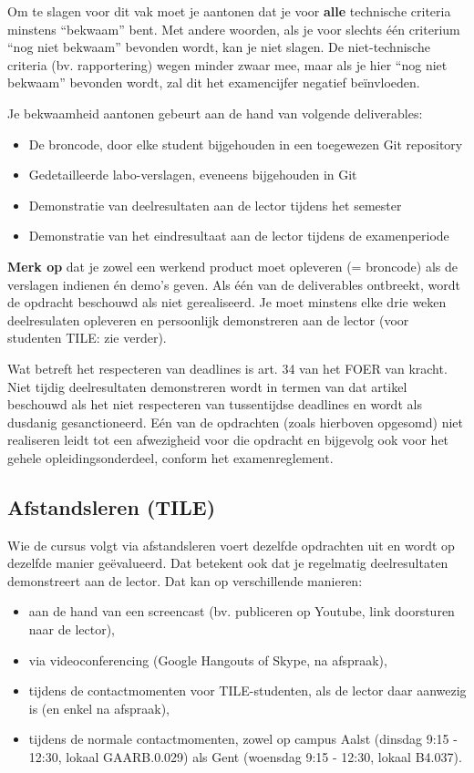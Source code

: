 Om te slagen voor dit vak moet je aantonen dat je voor \textbf{alle} technische criteria minstens ``bekwaam'' bent. Met andere woorden, als je voor slechts één criterium ``nog niet bekwaam'' bevonden wordt, kan je niet slagen. De niet-technische criteria (bv. rapportering) wegen minder zwaar mee, maar als je hier ``nog niet bekwaam'' bevonden wordt, zal dit het examencijfer negatief beïnvloeden.

Je bekwaamheid aantonen gebeurt aan de hand van volgende deliverables:

\begin{itemize}
\item De broncode, door elke student bijgehouden in een toegewezen Git repository
\item Gedetailleerde labo-verslagen, eveneens bijgehouden in Git
\item Demonstratie van deelresultaten aan de lector tijdens het semester
\item Demonstratie van het eindresultaat aan de lector tijdens de examenperiode
\end{itemize}

\textbf{Merk op} dat je zowel een werkend product moet opleveren (= broncode) als de verslagen indienen én demo's geven. Als één van de deliverables ontbreekt, wordt de opdracht beschouwd als niet gerealiseerd. Je moet minstens elke drie weken deelresulaten opleveren en persoonlijk demonstreren aan de lector (voor studenten TILE: zie verder).

Wat betreft het respecteren van deadlines is art. 34 van het FOER van kracht. Niet tijdig deelresultaten demonstreren wordt in termen van dat artikel beschouwd als het niet respecteren van tussentijdse deadlines en wordt als dusdanig gesanctioneerd. Eén van de opdrachten (zoals hierboven opgesomd) niet realiseren leidt tot een afwezigheid voor die opdracht en bijgevolg ook voor het gehele opleidingsonderdeel, conform het examenreglement.

\subsection{Afstandsleren (TILE)}
\label{afstandsleren-tile}

Wie de cursus volgt via afstandsleren voert dezelfde opdrachten uit en
wordt op dezelfde manier geëvalueerd. Dat betekent ook dat je regelmatig
deelresultaten demonstreert aan de lector. Dat kan op verschillende
manieren:

\begin{itemize}
\item aan de hand van een screencast (bv. publiceren op Youtube, link doorsturen naar de lector),
\item via videoconferencing (Google Hangouts of Skype, na afspraak),
\item tijdens de contactmomenten voor TILE-studenten, als de lector daar aanwezig is (en enkel na afspraak),
\item tijdens de normale contactmomenten, zowel op campus Aalst (dinsdag 9:15 - 12:30, lokaal GAARB.0.029) als Gent (woensdag 9:15 - 12:30, lokaal B4.037).
\end{itemize}

